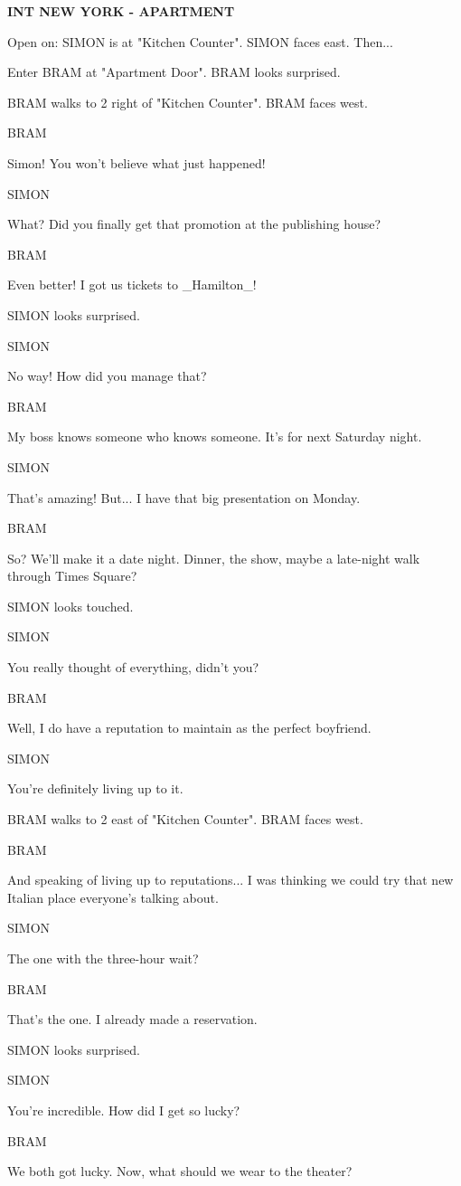 \documentclass[11pt,letterpaper,oldstylefigures]{memoir}
\newcommand{\slugline}[1]{\nobreak\textbf{\MakeUppercase{#1}}\par\nobreak\vspace{1\baselineskip}}
\newcommand{\speaker}[1]{\nobreak\hspace*{0.333\textwidth}\MakeUppercase{#1}\par\nobreak\vspace{0.5\baselineskip}}
\newcommand{\dialogue}[1]{\nobreak\hspace*{0.25\textwidth}\begin{minipage}{0.5\textwidth}#1\end{minipage}\par\vspace{1\baselineskip}}
\newcommand{\stagedir}[1]{#1\par\vspace{1\baselineskip}}
\newenvironment{FountainExample}
  {\begingroup
  \ttfamily\small
   \setlength{\parindent}{0pt}
  \setlength{\parskip}{0.5em}
  \allowdisplaybreaks
  \setlength{\displaywidowpenalty}{0}
  \setlength{\widowpenalty}{0}
  \setlength{\clubpenalty}{0}
  \setlength{\interlinepenalty}{0}
}
  {\endgroup}
\begin{document}
\begin{FountainExample}
\slugline{INT NEW YORK - APARTMENT}

\stagedir{Open on: SIMON is at "Kitchen Counter". SIMON faces east. Then...}
\stagedir{Enter BRAM at "Apartment Door". BRAM looks surprised.}
\stagedir{BRAM walks to 2 right of "Kitchen Counter". BRAM faces west.}

\speaker{BRAM}
\dialogue{Simon! You won't believe what just happened!}

\speaker{SIMON}
\dialogue{What? Did you finally get that promotion at the publishing house?}

\speaker{BRAM}
\dialogue{Even better! I got us tickets to \_Hamilton\_!}

\stagedir{SIMON looks surprised.}

\speaker{SIMON}
\dialogue{No way! How did you manage that?}

\speaker{BRAM}
\dialogue{My boss knows someone who knows someone. It's for next Saturday night.}

\speaker{SIMON}
\dialogue{That's amazing! But... I have that big presentation on Monday.}

\speaker{BRAM}
\dialogue{So? We'll make it a date night. Dinner, the show, maybe a late-night walk through Times Square?}

\stagedir{SIMON looks touched.}

\speaker{SIMON}
\dialogue{You really thought of everything, didn't you?}

\speaker{BRAM}
\dialogue{Well, I do have a reputation to maintain as the perfect boyfriend.}

\speaker{SIMON}
\dialogue{You're definitely living up to it.}

\stagedir{BRAM walks to 2 east of "Kitchen Counter". BRAM faces west.}

\speaker{BRAM}
\dialogue{And speaking of living up to reputations... I was thinking we could try that new Italian place everyone's talking about.}

\speaker{SIMON}
\dialogue{The one with the three-hour wait?}

\speaker{BRAM}
\dialogue{That's the one. I already made a reservation.}

\stagedir{SIMON looks surprised.}

\speaker{SIMON}
\dialogue{You're incredible. How did I get so lucky?}

\speaker{BRAM}
\dialogue{We both got lucky. Now, what should we wear to the theater?}
\end{FountainExample}
\end{document}
